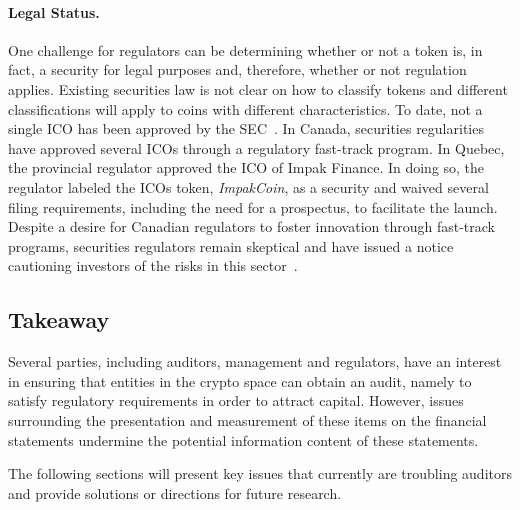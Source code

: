 \paragraph{Legal Status.} One challenge for regulators can be determining whether or not a token is, in fact, a security for legal purposes and, therefore, whether or not regulation applies. Existing securities law is not clear on how to classify tokens and different classifications will apply to coins with different characteristics. To date, not a single ICO has been approved by the SEC~\cite{SECICO2017}. In Canada, securities regularities have approved several ICOs through a regulatory fast-track program. In Quebec, the provincial regulator approved the ICO of Impak Finance. In doing so, the regulator labeled the ICO\textquotesingle s token, \textit{ImpakCoin}, as a security and waived several filing requirements, including the need for a prospectus, to facilitate the launch. Despite a desire for Canadian regulators to foster innovation through fast-track programs, securities regulators remain skeptical and have issued a notice cautioning investors of the risks in this sector~\cite{CSAICO2017}. 


\subsection{Takeaway}
Several parties, including auditors, management and regulators, have an interest in ensuring that entities in the crypto space can obtain an audit, namely to satisfy regulatory requirements in order to attract capital. However, issues surrounding the presentation and measurement of these items on the financial statements undermine the potential information content of these statements. 

The following sections will present key issues that currently are troubling auditors and provide solutions or directions for future research. 

